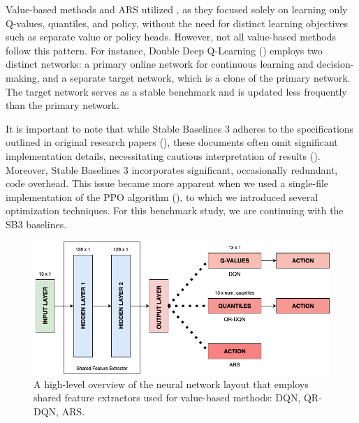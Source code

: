 \bigskip

\noindent Value-based methods and ARS utilized , as they focused solely on learning only Q-values, quantiles, and policy, without the need for distinct learning objectives such as separate value or policy heads. However, not all value-based methods follow this pattern. For instance, Double Deep Q-Learning (\textcolor{deepblue}{\cite{vanhasselt2015deep}}) employs two distinct networks: a primary online network for continuous learning and decision-making, and a separate target network, which is a clone of the primary network. The target network serves as a stable benchmark and is updated less frequently than the primary network.

\bigskip

\noindent It is important to note that while Stable Baselines 3 adheres to the specifications outlined in original research papers (\textcolor{deepblue}{\cite{stable-baselines3}}), these documents often omit significant implementation details, necessitating cautious interpretation of results (\textcolor{deepblue}{\cite{shengyi2022the37implementation}}). Moreover, Stable Baselines 3 incorporates significant, occasionally redundant, code overhead. This issue became more apparent when we used a single-file implementation of the PPO algorithm (\textcolor{deepblue}{\cite{huang2022cleanrl}}), to which we introduced several optimization techniques. For this benchmark study, we are continuing with the SB3 baselines.

\begin{figure}[htbp]
    \centering
    \includegraphics[width=0.8\linewidth]{images/methods_singleunit/net/shared_policy.png}
    \captionsetup{justification=justified, singlelinecheck=false, width=1\linewidth, labelfont=bf} 
    \caption[]{A high-level overview of the neural network layout that employs shared feature extractors used for value-based methods: DQN, QR-DQN, ARS.}
    \label{fig:shared-policy}
\end{figure}

